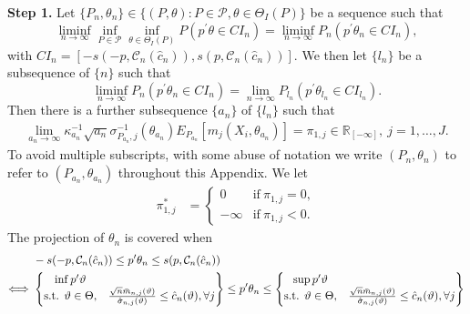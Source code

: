 \documentclass[letterpaper,11pt]{article}
\theoremstyle{myplain}
\theoremstyle{mydefinition}
\theoremstyle{myremark}
\newcommand{\R}{\mathbb{R}}
\newcommand{\cC}{\mathcal{C}}
\newcommand{\cP}{\mathcal{P}}
\numberwithin{equation}{section}
\numberwithin{figure}{section}
\begin{document}
\begin{appendices}
\noindent \textbf{Step 1.} Let $\{P_n,\theta_n\} \in \{(P,\theta):P \in \cP,\theta \in \Theta_I(P)\}$ be a sequence such that
\begin{equation}
\liminf_{n\to\infty}\inf_{P\in\mathcal P}	\inf_{\theta \in \Theta_I(P)}P(p^\prime \theta \in CI_n)=\liminf_{n\to\infty}P_n(p^\prime \theta_n \in CI_n),\label{eq:cover2}
\end{equation}
with $CI_n=[-s(-p,\cC_n(\hat{c}_n)),s(p,\cC_n(\hat{c}_n))]$. We then let $\{l_n\}$ be a subsequence of $\{n\}$ such that 
\begin{equation}
\liminf_{n\to\infty}P_n(p^\prime \theta_n \in CI_n)=\lim_{n\to\infty}P_{l_n}(p^\prime \theta_{l_n} \in CI_{l_n}).\label{eq:cover3}
\end{equation}
Then there is a further subsequence $\{a_n\}$ of $\{l_n\}$ such that
\begin{align}
\lim_{a_n \to \infty} \kappa_{a_n}^{-1} \sqrt {a_n} \sigma_{P_{a_n},j}^{-1}(\theta_{a_n})E_{P_{a_n}}[m_j(X_i,\theta_{a_n})] = \pi_{1,j} \in \R_{[-\infty]},~j=1,\dots,J.\label{eq:pi_def}
\end{align}
To avoid multiple subscripts, with some abuse of notation we write $(P_n,\theta_n)$ to refer to $(P_{a_n},\theta_{a_n})$ throughout this Appendix. 
We let
\begin{align}
\pi_{1,j}^*&=\left\{ \begin{matrix}
   0 & \mathrm{if}~\pi_{1,j}=0,\\
   -\infty & \mathrm{if}~\pi_{1,j}<0.
\end{matrix}\label{eq:def_pi_star}
 \right.
\end{align}
The projection of $\theta_n$ is covered when
\begin{align}
& ~-s(-p,\mathcal C_n(\hat{c}_n))\le p'\theta_n  \le s(p,\mathcal C_n(\hat{c}_n))\notag \\
	 \Longleftrightarrow &~ \begin{Bmatrix} \inf p^\prime\vartheta  &   \\ \text{s.t. } \vartheta \in \Theta, & \frac{\sqrt n \bar{m}_{n,j}(\vartheta)}{\hat\sigma_{n,j}(\vartheta)}\le  \hat{c}_n(\vartheta),  \forall j \end{Bmatrix} \le  p'\theta_n  \notag \le  \begin{Bmatrix} \sup p'\vartheta  &   \\ \text{s.t. } \vartheta \in \Theta, & \frac{\sqrt n \bar{m}_{n,j}(\vartheta)}{\hat\sigma_{n,j}(\vartheta)}\le  \hat{c}_n(\vartheta), \forall j \end{Bmatrix}\\

\end{align}
\end{appendices}
\end{document}
